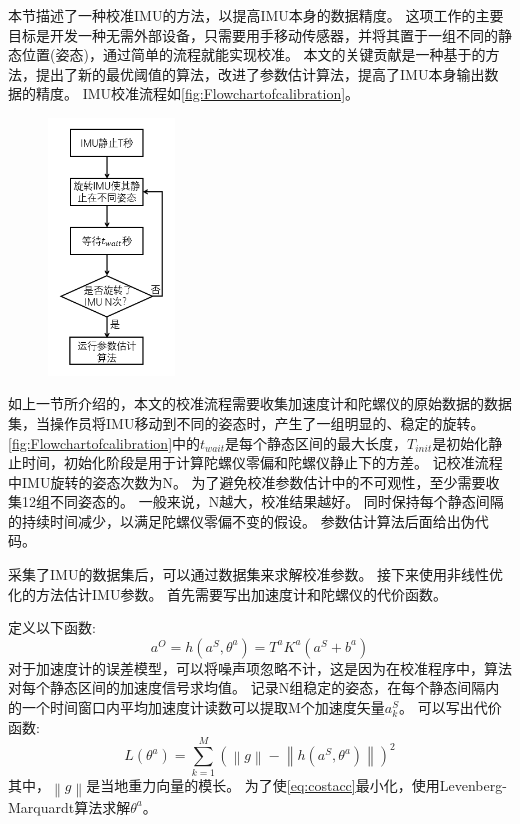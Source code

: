 \documentclass[
  type=master
]{gdutthesis}
\begin{document}
本节描述了一种校准IMU的方法，以提高IMU本身的数据精度。
这项工作的主要目标是开发一种无需外部设备，只需要用手移动传感器，并将其置于一组不同的静态位置(姿态)，通过简单的流程就能实现校准。
本文的关键贡献是一种基于\parencite{tedaldi2014robust}的方法，提出了新的最优阈值的算法，改进了参数估计算法，提高了IMU本身输出数据的精度。
IMU校准流程如\autoref{fig:Flowchartofcalibration}。
\begin{figure}[htbp]
	\centering
	\includegraphics[width=0.3\textwidth]{屏幕截图 2022-04-03 100222.png}
	\label{fig:Flowchartofcalibration}
\end{figure}

如上一节所介绍的，本文的校准流程需要收集加速度计和陀螺仪的原始数据的数据集，当操作员将IMU移动到不同的姿态时，产生了一组明显的、稳定的旋转。
\autoref{fig:Flowchartofcalibration}中的$t_{wait}$是每个静态区间的最大长度，$T_{init}$是初始化静止时间，初始化阶段是用于计算陀螺仪零偏和陀螺仪静止下的方差。
记校准流程中IMU旋转的姿态次数为N。
为了避免校准参数估计中的不可观性，至少需要收集12组不同姿态的。
一般来说，N越大，校准结果越好。
同时保持每个静态间隔的持续时间减少，以满足陀螺仪零偏不变的假设。
参数估计算法后面给出伪代码。

采集了IMU的数据集后，可以通过数据集来求解校准参数。
接下来使用非线性优化的方法估计IMU参数。
首先需要写出加速度计和陀螺仪的代价函数。

定义以下函数:
\begin{equation}
	a^O=h(a^S,\theta^a) =T^a K^a (a^S + b^a)
\end{equation}
对于加速度计的误差模型，可以将噪声项忽略不计，这是因为在校准程序中，算法对每个静态区间的加速度信号求均值。
记录N组稳定的姿态，在每个静态间隔内的一个时间窗口内平均加速度计读数可以提取M个加速度矢量$a^S_k$。
可以写出代价函数:
\begin{equation}\label{eq:costacc}
	L(\theta^a)=\sum_{k=1}^{M}(\left\|g\right\|-\left\|h(a^S,\theta^a)\right\|)^2
\end{equation}
其中，$\left\|g\right\|$是当地重力向量的模长。
为了使\autoref{eq:costacc}最小化，使用Levenberg-Marquardt算法求解$\theta^a$。
\end{document}
